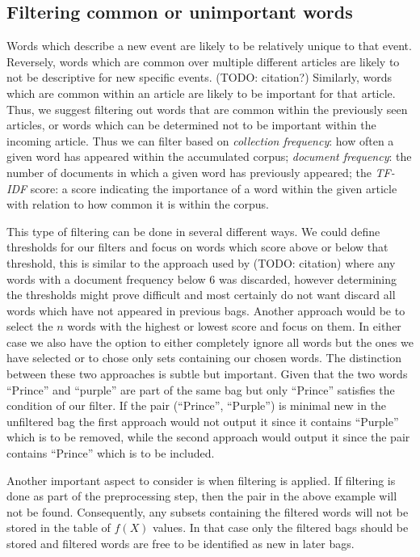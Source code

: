 \subsection{Filtering common or unimportant words}
Words which describe a new event are likely to be relatively unique to that event. Reversely, words which are common over multiple different articles are likely to not be descriptive for new specific events. (TODO: citation?) Similarly, words which are common within an article are likely to be important for that article. Thus, we suggest filtering out words that are common within the previously seen articles, or words which can be determined not to be important within the incoming article. Thus we can filter based on \emph{collection frequency}: how often a given word has appeared within the accumulated corpus; \emph{document frequency}: the number of documents in which a given word has previously appeared; the \emph{TF-IDF} score: a score indicating the importance of a word within the given article with relation to how common it is within the corpus.

This type of filtering can be done in several different ways. We could define thresholds for our filters and focus on words which score above or below that threshold, this is similar to the approach used by (TODO: citation) where any words with a document frequency below 6 was discarded, however determining the thresholds might prove difficult and most certainly do not want discard all words which have not appeared in previous bags. Another approach would be to select the $n$ words with the highest or lowest score and focus on them. In either case we also have the option to either completely ignore all words but the ones we have selected or to chose only sets containing our chosen words. The distinction between these two approaches is subtle but important. Given that the two words ``Prince'' and ``purple'' are part of the same bag but only ``Prince'' satisfies the condition of our filter. If the pair (``Prince'', ``Purple'') is minimal new in the unfiltered bag the first approach would not output it since it contains ``Purple'' which is to be removed, while the second approach would output it since the pair contains ``Prince'' which is to be included. 

Another important aspect to consider is when filtering is applied. If filtering is done as part of the preprocessing step, then the pair in the above example will not be found. Consequently, any subsets containing the filtered words will not be stored in the table of $f(X)$ values. In that case only the filtered bags should be stored and filtered words are free to be identified as new in later bags. 

